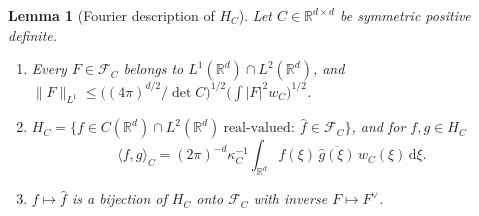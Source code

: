 \documentclass[11pt]{article}
\newtheorem{lemma}{Lemma}
\theoremstyle{definition}
\theoremstyle{remark}
\newcommand{\R}{\mathbb{R}}
\newcommand{\dd}{\,\mathrm{d}}
\newcommand{\FC}[1]{\mathcal{F}_{#1}}
\newcommand{\ip}[2]{\langle #1,#2\rangle}
\newcommand{\hatf}[1]{\widehat{#1}}
\begin{document}
\begin{lemma}[Fourier description of $H_C$]\label{lem:fourier}
Let $C\in\R^{d\times d}$ be symmetric positive definite.
\begin{enumerate}
\item[(a)] Every $F\in\FC{C}$ belongs to $L^1(\R^d)\cap L^2(\R^d)$, and
$\|F\|_{L^1}\le\bigl((4\pi)^{d/2}/\det C\bigr)^{1/2}\bigl(\int|F|^2w_C\bigr)^{1/2}$.
\item[(b)] $H_C=\{f\in C(\R^d)\cap L^2(\R^d)\ \text{real-valued}:\ \hatf f\in\FC{C}\}$, and for $f,g\in H_C$
\begin{equation}\label{eq:normC}
\ip fg_C=(2\pi)^{-d}\kappa_C^{-1}\int_{\R^d}\hatf f(\xi)\,\overline{\hatf g(\xi)}\,w_C(\xi)\dd\xi .
\end{equation}
\item[(c)] $f\mapsto\hatf f$ is a bijection of $H_C$ onto $\FC{C}$ with inverse $F\mapsto F^\vee$.
\end{enumerate}
\end{lemma}
\end{document}

